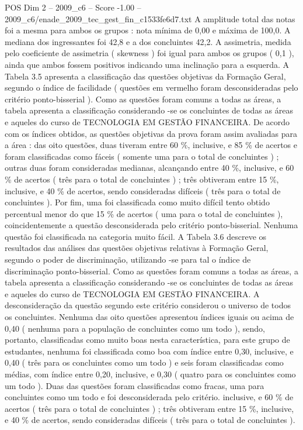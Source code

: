\begin{textsample}{POS Dim 2 – 2009\_c6 – Score -1.00 – 2009\_c6/enade\_2009\_tec\_gest\_fin\_c1533fe6d7.txt}
A amplitude total das notas foi a mesma para ambos os grupos : nota mínima de 0,00 e máxima de 100,0.
A mediana dos ingressantes foi 42,8 e a dos concluintes 42,2.
A assimetria, medida pelo coeficiente de assimetria ( skewness ) foi igual para ambos os grupos ( 0,1 ), ainda que ambos fossem positivos indicando uma inclinação para a esquerda.
A Tabela 3.5 apresenta a classificação das questões objetivas da Formação Geral, segundo o índice de facilidade ( questões em vermelho foram desconsideradas pelo critério ponto-bisserial ).
Como as questões foram comuns a todas as áreas, a tabela apresenta a classificação considerando -se os concluintes de todas as áreas e aqueles do curso de TECNOLOGIA EM GESTÃO FINANCEIRA.
De acordo com os índices obtidos, as questões objetivas da prova foram assim avaliadas para a área : das oito questões, duas tiveram entre 60 \%, inclusive, e 85 \% de acertos e foram classificadas como fáceis ( somente uma para o total de concluintes ) ; outras duas foram consideradas medianas, alcançando entre 40 \%, inclusive, e 60 \% de acertos ( três para o total de concluintes ) ; três obtiveram entre 15 \%, inclusive, e 40 \% de acertos, sendo consideradas difíceis ( três para o total de concluintes ).
Por fim, uma foi classificada como muito difícil tento obtido percentual menor do que 15 \% de acertos ( uma para o total de concluintes ), coincidentemente a questão desconsiderada pelo critério ponto-bisserial.
Nenhuma questão foi classificada na categoria muito fácil.
A Tabela 3.6 descreve os resultados das análises das questões objetivas relativas à Formação Geral, segundo o poder de discriminação, utilizando -se para tal o índice de discriminação ponto-bisserial.
Como as questões foram comuns a todas as áreas, a tabela apresenta a classificação considerando -se os concluintes de todas as áreas e aqueles do curso de TECNOLOGIA EM GESTÃO FINANCEIRA.
A desconsideração da questão segundo este critério considerou o universo de todos os concluintes.
Nenhuma das oito questões apresentou índices iguais ou acima de 0,40 ( nenhuma para a população de concluintes como um todo ), sendo, portanto, classificadas como muito boas nesta característica, para este grupo de estudantes, nenhuma foi classificada como boa com índice entre 0,30, inclusive, e 0,40 ( três para os concluintes como um todo ) e seis foram classificadas como médias, com índice entre 0,20, inclusive, e 0,30 ( quatro para os concluintes como um todo ).
Duas das questões foram classificadas como fracas, uma para concluintes como um todo e foi desconsiderada pelo critério. inclusive, e 60 \% de acertos ( três para o total de concluintes ) ; três obtiveram entre 15 \%, inclusive, e 40 \% de acertos, sendo consideradas difíceis ( três para o total de concluintes ).

\end{textsample}
